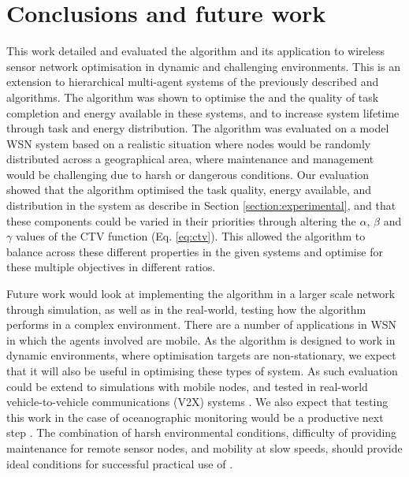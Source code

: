 \section{Conclusions and future work}
\label{section:conclusions}

This work detailed and evaluated the \acronymWSNOptimisation{}{} algorithm and its application to wireless sensor network optimisation in dynamic and challenging environments. This is an extension to hierarchical multi-agent systems of the previously described \acronymATARIA{}{} and \acronymMGRAO{}{} algorithms. The algorithm was shown to optimise the and the quality of task completion and energy available in these systems, and to increase system lifetime through task and energy distribution. The algorithm was evaluated on a model WSN system based on a realistic situation where nodes would be randomly distributed across a geographical area, where maintenance and management would be challenging due to harsh or dangerous conditions.  Our evaluation showed that the \acronymWSNOptimisation{}{} algorithm optimised the task quality, energy available, and distribution in the system as describe in Section \ref{section:experimental}, and that these components could be varied in their priorities through altering the $\alpha$, $\beta$ and $\gamma$ values of the CTV function (Eq. \ref{eq:ctv}). This allowed the algorithm to balance across these different properties in the given systems and optimise for these multiple objectives in different ratios. 

Future work would look at implementing the algorithm in a larger scale network through simulation, as well as in the real-world, testing how the algorithm performs in a complex environment. There are a number of applications in WSN in which the agents involved are mobile. As the \acronymWSNOptimisation{}{} algorithm is designed to work in dynamic environments, where optimisation targets are non-stationary, we expect that it will also be useful in optimising these types of system. As such evaluation could be extend to simulations with mobile nodes, and tested in real-world vehicle-to-vehicle communications (V2X) systems \citep{Gupta2017, Tong2019}. We also expect that testing this work in the case of oceanographic monitoring would be a productive next step \citep{Albaladejo2010a}. The combination of harsh environmental conditions, difficulty of providing maintenance for remote sensor nodes, and mobility at slow speeds, should provide ideal conditions for successful practical use of \acronymWSNOptimisation{}{}.


  